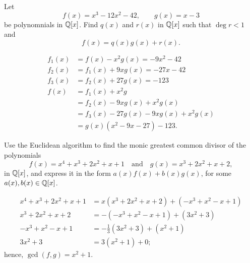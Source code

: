 
\setcounter{question}{15}
\question Let
\[ f(x) = x^3 - 12x^2 - 42, \qquad g(x) = x - 3 \]
be polynomnials in $\mathbb{Q}[x]$. Find $q(x)$ and $r(x)$ in $\mathbb{Q}[x]$ such that $\deg{r} < 1$ and
\[ f(x) = q(x)g(x) + r(x). \]
\begin{solution}
    \begin{align*}
        f_1(x) &= f(x) - x^2g(x) = -9x^2-42 \\
        f_2(x) &= f_1(x) + 9xg(x) = -27x - 42 \\
        f_3(x) &= f_2(x) + 27g(x) = -123 \\
        f(x)   &= f_1(x) + x^2g \\
               &= f_2(x) - 9xg(x) + x^2g(x) \\
               &= f_3(x) - 27g(x) - 9xg(x) + x^2g(x) \\
               &= g(x)(x^2-9x-27) - 123.
    \end{align*}
\end{solution}

\setcounter{question}{16}
\question Use the Euclidean algorithm to find the  monic greatest common divisor of the polynomials
\[ 
    f(x) = x^4 + x^3 + 2x^2 + x + 1 
    \quad \text{and} \quad 
    g(x) = x^3 + 2x^2 + x + 2, 
\]
in $\mathbb{Q}[x]$, and express it in the form $a(x)f(x) + b(x)g(x)$, for some $a(x), b(x) \in \mathbb{Q}[x]$.
\begin{solution}
    \begin{align*}
        x^4 + x^3 + 2x^2 + x + 1 &= x (x^3 + 2x^2 + x + 2) + (-x^3 + x^2 - x + 1) \\
        x^3 + 2x^2 + x + 2 &= -(-x^3 + x^2 - x + 1) + (3x^2 + 3) \\
        -x^3 + x^2 - x + 1 &= -\frac13 (3x^2 + 3) + (x^2 + 1) \\
        3x^2 + 3 &= 3(x^2 + 1) + 0;
    \end{align*}
    hence, $\gcd(f, g) = x^2 + 1$.
\end{solution}


